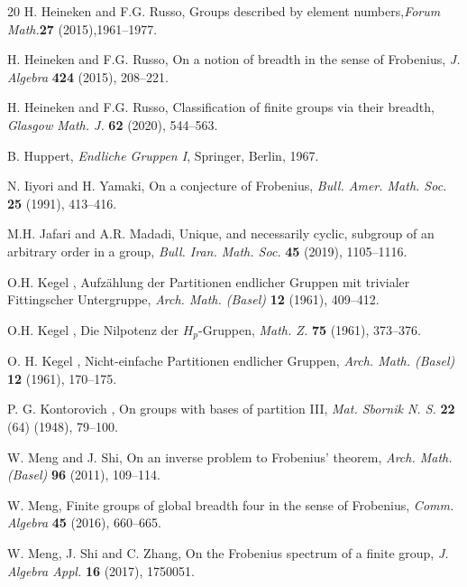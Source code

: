 \documentclass{amsart}
\theoremstyle{definition}
\numberwithin{equation}{section}
\begin{document}
\begin{thebibliography}{20}
H. Heineken and F.G. Russo, Groups described by element numbers,\textit{Forum Math.}\textbf{27} (2015),1961--1977.


H. Heineken and F.G. Russo, On a notion of breadth in the sense of Frobenius, \textit{J. Algebra} \textbf{424} (2015), 208--221.

H. Heineken and F.G. Russo, Classification of finite groups via their breadth, \textit{Glasgow Math. J.} \textbf{62} (2020), 544--563. 



 B. Huppert, \textit{Endliche Gruppen I}, Springer, Berlin, 1967.


N. Iiyori and H. Yamaki, On a conjecture of Frobenius, \textit{Bull. Amer. Math. Soc.} \textbf{25} (1991), 413--416.


 M.H. Jafari  and A.R. Madadi, Unique, and necessarily cyclic, subgroup of an arbitrary order in a group, \textit{Bull. Iran. Math. Soc.} \textbf{45} (2019),   1105--1116.

 O.H. Kegel , Aufz\"ahlung der Partitionen endlicher Gruppen mit trivialer Fittingscher Untergruppe, \textit{Arch. Math. (Basel)} \textbf{12} (1961), 409--412.

 O.H. Kegel , Die Nilpotenz der $H_p$-Gruppen, \textit{Math. Z.} \textbf{75} (1961), 373--376.

 O. H. Kegel , Nicht-einfache Partitionen endlicher Gruppen, \textit{Arch. Math. (Basel)} \textbf{12} (1961),  170--175.


P. G. Kontorovich , On groups with bases of partition III, \textit{Mat. Sbornik N. S.} \textbf{22} (64) (1948), 79--100.

 W. Meng and J. Shi, On an inverse problem to Frobenius' theorem, \textit{Arch. Math. (Basel)} \textbf{96} (2011), 109--114.

 W. Meng, Finite groups of global breadth four in the sense of Frobenius, \textit{Comm. Algebra} \textbf{45} (2016), 660--665.

 W. Meng, J. Shi and C. Zhang, On the Frobenius spectrum of a finite group, \textit{J. Algebra Appl.} \textbf{16} (2017),  1750051.


\end{thebibliography}
\end{document}
